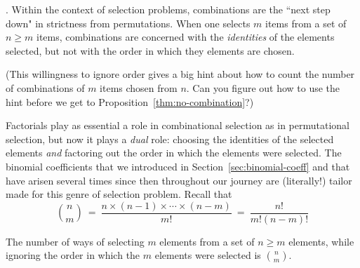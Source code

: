 
\medskip

.
Within the context of selection problems, combinations are the ``next step down" in
strictness from permutations.  When one selects $m$ items from a set of $n \geq m$ items,
combinations are concerned with the {\em identities} of the elements selected, but not with 
the order in which they elements are chosen.

\noindent (This willingness to ignore order gives a big hint about how to count the number of
combinations of $m$ items chosen from $n$.  Can you figure out how to use the hint before
we get to Proposition~\ref{thm:no-combination}?)

\medskip

Factorials play as essential a role in combinational selection as in permutational selection, but
now it plays a {\em dual} role: choosing the identities of the selected elements {\em and} factoring out
the order in which the elements were selected.  The binomial coefficients that we introduced
in Section~\ref{sec:binomial-coeff} and that have arisen several times since then
throughout our journey are
(literally!) tailor made for this genre of selection problem.  Recall that
\[ {n \choose m} \ = \ \frac{n \times (n-1) \times \cdots \times (n-m)}{m!} \ = \  \frac{n!}{m!(n-m)!} 
\]

\begin{prop}
\label{thm:no-combination}
The number of ways of selecting $m$ elements from a set of $n \geq m$ elements, while 
ignoring the order in which the $m$ elements were selected is $\displaystyle {n \choose m}$.
\end{prop}

